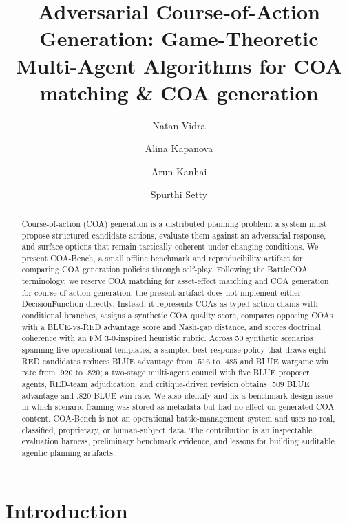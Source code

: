 \documentclass[sigconf]{acmart}
\title{Adversarial Course-of-Action Generation: Game-Theoretic Multi-Agent Algorithms for COA matching \& COA generation}
\author{Natan Vidra}
\affiliation{%
  \institution{Anote AI}
  \city{New York}
  \country{United States}}
\author{Alina Kapanova}
\affiliation{%
  \institution{Anote AI, Cornell University}
  \city{New York}
  \country{United States}}
\author{Arun Kanhai}
\affiliation{%
  \institution{Anote AI, CUNY}
  \city{New York}
  \country{United States}}
\author{Spurthi Setty}
\affiliation{%
  \institution{Stevens Institute of Technology}
  \city{New York}
  \country{United States}}
\begin{document}
\begin{abstract}
Course-of-action (COA) generation is a distributed planning problem: a system must propose structured candidate actions, evaluate them against an adversarial response, and surface options that remain tactically coherent under changing conditions. We present COA-Bench, a small offline benchmark and reproducibility artifact for comparing COA generation policies through self-play. Following the BattleCOA terminology, we reserve COA matching for asset-effect matching and COA generation for course-of-action generation; the present artifact does not implement either DecisionFunction directly. Instead, it represents COAs as typed action chains with conditional branches, assigns a synthetic COA quality score, compares opposing COAs with a BLUE-vs-RED advantage score and Nash-gap distance, and scores doctrinal coherence with an FM 3-0-inspired heuristic rubric. Across 50 synthetic scenarios spanning five operational templates, a sampled best-response policy that draws eight RED candidates reduces BLUE advantage from .516 to .485 and BLUE wargame win rate from .920 to .820; a two-stage multi-agent council with five BLUE proposer agents, RED-team adjudication, and critique-driven revision obtains .509 BLUE advantage and .820 BLUE win rate. We also identify and fix a benchmark-design issue in which scenario framing was stored as metadata but had no effect on generated COA content. COA-Bench is not an operational battle-management system and uses no real, classified, proprietary, or human-subject data. The contribution is an inspectable evaluation harness, preliminary benchmark evidence, and lessons for building auditable agentic planning artifacts.
\end{abstract}



\maketitle

\section{Introduction}
\end{document}
